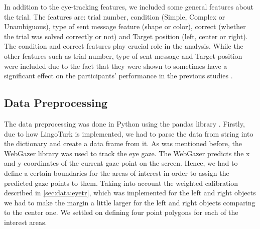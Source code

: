 In addition to the eye-tracking features, we included some general features about the trial. The features are: trial number, condition (Simple, Complex or Unambiguous), type of sent message feature (shape or color), correct (whether the trial was solved correctly or not) and Target position (left, center or right). The condition and correct features play crucial role in the analysis. While the other features such as trial number, type of sent message and Target position were included due to the fact that they were shown to sometimes have a significant effect on the participants' performance in the previous studies \citep{Mayn_2023, Mayn_2025}.

\subsection{Data Preprocessing}
\label{sec:analysis:preprocessing}
The data preprocessing was done in Python using the pandas library \citep{pandas}. Firstly, due to how LingoTurk \citep{lingoturk} is implemented, we had to parse the data from string into the dictionary and create a data frame from it. As was mentioned before, the WebGazer \citep{webgazer} library was used to track the eye gaze. The WebGazer predicts the x and y coordinates of the current gaze point on the screen. Hence, we had to define a certain boundaries for the areas of interest in order to assign the predicted gaze points to them. Taking into account the weighted calibration described in \autoref{sec:data:eyetr}, which was implemented for the left and right objects we had to make the margin a little larger for the left and right objects comparing to the center one. We settled on defining four point polygons for each of the interest areas. 

